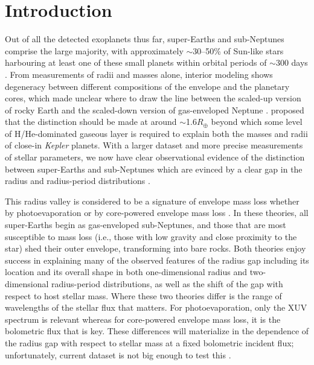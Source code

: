 \documentclass[twocolumn]{aastex631}
\begin{document}
\section{Introduction}
\label{sec:intro}

Out of all the detected exoplanets thus far, super-Earths and sub-Neptunes comprise the large majority, with approximately $\sim$30--50\% of Sun-like stars harbouring at least one of these small planets within orbital periods of $\sim$300 days \citep[e.g.,][]{fressin13,petigura13,burke15,Zhu18}. From measurements of radii and masses alone, interior modeling shows degeneracy between different compositions of the envelope and the planetary cores, which made unclear where to draw the line between the scaled-up version of rocky Earth and the scaled-down version of gas-enveloped Neptune \citep[e.g.,][]{rogers10-general}. \citet{Rogers15} proposed that the distinction should be made at around $\sim$1.6$R_\oplus$ beyond which some level of H/He-dominated gaseous layer is required to explain both the masses and radii of close-in {\it Kepler} planets. With a larger dataset and more precise measurements of stellar parameters, we now have clear observational evidence of the distinction between super-Earths and sub-Neptunes which are evinced by a clear gap in the radius and radius-period distributions \citep[e.g.,][]{Fulton17,vanEylen18, Martinez19,Petigura20,David21}.

This radius valley is considered to be a signature of envelope mass loss whether by photoevaporation \citep{Owen13,Owen17} or by core-powered envelope mass loss \citep{Ginzburg18,Gupta19}. In these theories, all super-Earths begin as gas-enveloped sub-Neptunes, and those that are most susceptible to mass loss (i.e., those with low gravity and close proximity to the star) shed their outer envelope, transforming into bare rocks. Both theories enjoy success in explaining many of the observed features of the radius gap including its location and its overall shape in both one-dimensional radius and two-dimensional radius-period distributions, as well as the shift of the gap with respect to host stellar mass. Where these two theories differ is the range of wavelengths of the stellar flux that matters. For photoevaporation, only the XUV spectrum is relevant whereas for core-powered envelope mass loss, it is the bolometric flux that is key. These differences will materialize in the dependence of the radius gap with respect to stellar mass at a fixed bolometric incident flux; unfortunately, current dataset is not big enough to test this \citep{Loyd20,Rogers21_comb}. 
\end{document}
